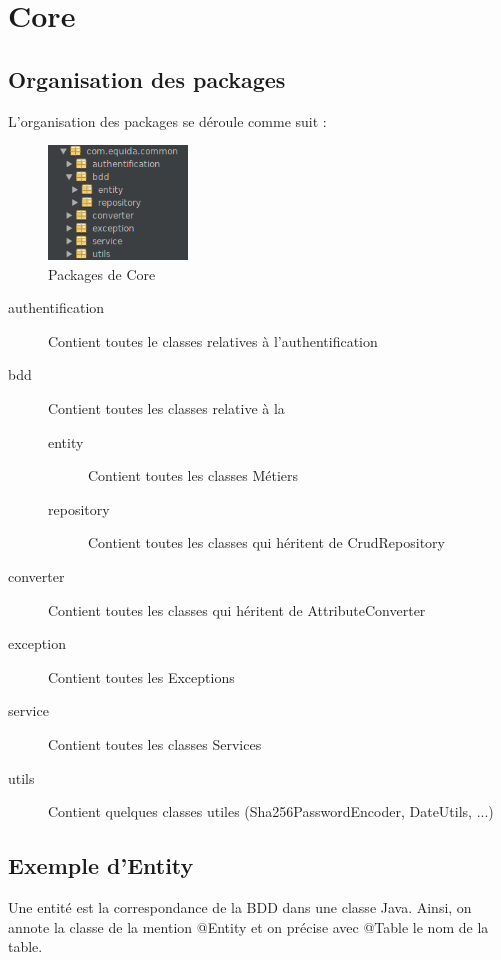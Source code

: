\chapter{Core}
	\section{Organisation des packages}

		L'organisation des packages se déroule comme suit :

		\begin{figure}[H]
			\centering\includegraphics[width=0.33\textwidth, keepaspectratio]{res/core-package.png}
			\caption{Packages de Core}
		\end{figure}

		\begin{description}
			\item[authentification]{Contient toutes le classes relatives à l'authentification}
			\item[bdd]{Contient toutes les classes relative à la \bdd{}}

			\begin{description}
				\item[entity]{Contient toutes les classes Métiers}
				\item[repository]{Contient toutes les classes qui héritent de CrudRepository}
			\end{description}

			\item[converter]{Contient toutes les classes qui héritent de AttributeConverter}
			\item[exception]{Contient toutes les Exceptions}
			\item[service]{Contient toutes les classes Services}
			\item[utils]{Contient quelques classes utiles (Sha256PasswordEncoder, DateUtils, ...)}
		\end{description}

	\section{Exemple d'Entity}
		Une entité est la correspondance de la BDD dans une classe Java. \newline
		Ainsi, on annote la classe de la mention @Entity et on précise avec @Table le nom de la table. \newline

